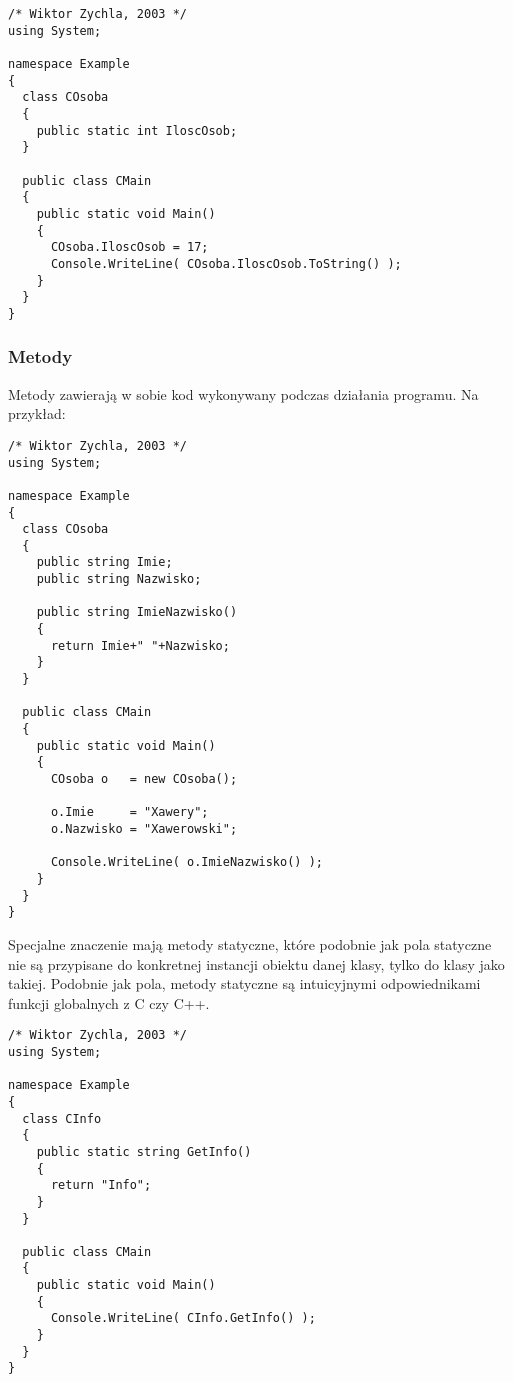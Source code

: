 \begin{scriptsize}
\begin{verbatim}
/* Wiktor Zychla, 2003 */
using System;

namespace Example
{
  class COsoba 
  {
    public static int IloscOsob; 
  } 

  public class CMain
  {
    public static void Main()
    {
      COsoba.IloscOsob = 17;
      Console.WriteLine( COsoba.IloscOsob.ToString() );
    }
  }
}
\end{verbatim}
\end{scriptsize}

\subsubsection{Metody}

Metody zawierają w sobie kod wykonywany podczas działania programu. Na przykład:

\begin{scriptsize}
\begin{verbatim}
/* Wiktor Zychla, 2003 */
using System;

namespace Example
{
  class COsoba 
  {
    public string Imie;
    public string Nazwisko;

    public string ImieNazwisko()
    {
      return Imie+" "+Nazwisko;
    }
  } 

  public class CMain
  {
    public static void Main()
    {
      COsoba o   = new COsoba();

      o.Imie     = "Xawery";
      o.Nazwisko = "Xawerowski";

      Console.WriteLine( o.ImieNazwisko() );
    }
  }
}
\end{verbatim}
\end{scriptsize}

Specjalne znaczenie mają metody statyczne, które podobnie jak pola statyczne nie są przypisane do
konkretnej instancji obiektu danej klasy, tylko do klasy jako takiej. Podobnie jak pola, metody statyczne
są intuicyjnymi odpowiednikami funkcji globalnych z C czy C++.

\begin{scriptsize}
\begin{verbatim}
/* Wiktor Zychla, 2003 */
using System;

namespace Example
{
  class CInfo
  {
    public static string GetInfo()
    {
      return "Info";
    }
  } 

  public class CMain
  {
    public static void Main()
    {
      Console.WriteLine( CInfo.GetInfo() );
    }
  }
}
\end{verbatim}
\end{scriptsize}


